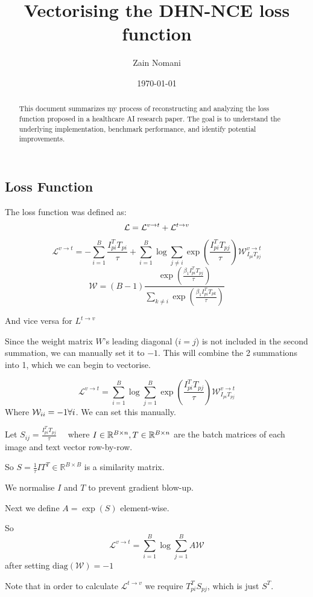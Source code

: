 \documentclass[a4paper,12pt]{article}
\title{Vectorising the DHN-NCE loss function}
\author{Zain Nomani}
\date{\today}
\begin{document}
\maketitle

\begin{abstract}
This document summarizes my process of reconstructing and analyzing the loss function proposed in a healthcare AI research paper. 
The goal is to understand the underlying implementation, benchmark performance, and identify potential improvements.
\end{abstract}
\subsection{Loss Function}
The loss function was defined as:
\[
	\mathcal L = \mathcal L ^{v \to t} + \mathcal L ^{t \to v} \\
\]
\[
	\mathcal L ^{v \to t} = - \sum ^B _{i=1} \frac {I_{pi}^TT_{pi}}{\tau} + \sum ^B _{i=1} \log \sum _{j \ne i} \exp(\frac {I_{pi}^TT_{pj}}{\tau}) \mathcal W _{I_{pi}T_{pj}} ^{v \to t}
\]
\[
	\mathcal W = (B-1) \frac {\exp( \frac {\beta _1 I_{pi}^TT_{pj}}{\tau})} { \sum _{k \ne i} \exp(\frac {\beta _1 I_{pi}^TT_{pk}}{\tau})}
\]

And vice versa for $L^{t \to v}$

Since the weight matrix $W$'s leading diagonal ($i=j$) is not included in the second summation, we can manually set it to $-1$.
This will combine the 2 summations into 1, which we can begin to vectorise.

\[
	\mathcal L ^{v \to t} = \sum ^B _{i=1} \log \sum ^B _{j=1} \exp(\frac {I_{pi}^TT_{pj}}{\tau}) \mathcal W _{I_{pi}T_{pj}}^{v\to t}
\]
Where $\mathcal W _{ii} = -1 \space \forall i$. We can set this manually.

Let $S_{ij} = \frac {I_{pi}^TT_{pj}}{\tau} \quad$ where $I \in \mathbb R ^{B \times n}, \space T \in \mathbb R ^{B \times n}$ are the batch matrices of each image and text vector row-by-row.

So $S = \frac 1 \tau IT^T \in \mathbb R ^{B\times B}$ is a similarity matrix.

We normalise $I$ and $T$ to prevent gradient blow-up.

Next we define $A=\exp(S)$ element-wise.

So
$$
	\mathcal L^{v\to t} = \sum ^B _{i=1} \log \sum ^B _{j=1} A \mathcal W
$$
after setting $\text{diag}(\mathcal W) = -1$

Note that in order to calculate $\mathcal L ^{t\to v}$ we require $T_{pi}^TS_{pj}$, which is just $S^T$.
\end{document}
